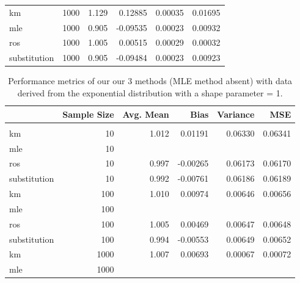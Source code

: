 \documentclass[12pt, twoside]{amherstthesis}
\begin{document}
\begin{table}
\begin{tabular}[t]{lrrrrr}
\hspace{1em}km & 1000 & 1.129 & 0.12885 & 0.00035 & 0.01695\\
\hspace{1em}mle & 1000 & 0.905 & -0.09535 & 0.00023 & 0.00932\\
\hspace{1em}ros & 1000 & 1.005 & 0.00515 & 0.00029 & 0.00032\\
\hspace{1em}substitution & 1000 & 0.905 & -0.09484 & 0.00023 & 0.00923\\
\bottomrule
\end{tabular}
\end{table}
\begin{table}

\caption{\label{tab:exptable}Performance metrics of our our 3 
             methods (MLE method absent) with data derived from the 
             exponential distribution with a shape parameter = 1.}
\centering
\fontsize{11.5}{13.5}\selectfont
\begin{tabular}[t]{lrrrrr}
\toprule
  & Sample Size & Avg. Mean & Bias & Variance & MSE\\
\midrule
\addlinespace[0.3em]
\multicolumn{6}{l}{\textbf{Censoring Rate = 0.1}}\\
\hspace{1em}km & 10 & 1.012 & 0.01191 & 0.06330 & 0.06341\\
\hspace{1em}mle & 10 &  &  &  \vphantom{2} & \\
\hspace{1em}ros & 10 & 0.997 & -0.00265 & 0.06173 & 0.06170\\
\hspace{1em}substitution & 10 & 0.992 & -0.00761 & 0.06186 & 0.06189\\
\hspace{1em}km & 100 & 1.010 & 0.00974 & 0.00646 & 0.00656\\
\hspace{1em}mle & 100 &  &  &  \vphantom{2} & \\
\hspace{1em}ros & 100 & 1.005 & 0.00469 & 0.00647 & 0.00648\\
\hspace{1em}substitution & 100 & 0.994 & -0.00553 & 0.00649 & 0.00652\\
\hspace{1em}km & 1000 & 1.007 & 0.00693 & 0.00067 & 0.00072\\
\hspace{1em}mle & 1000 &  &  &  \vphantom{2} & \\

\end{tabular}
\end{table}
\end{document}
